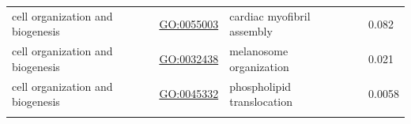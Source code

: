 \documentclass[
]{article}
\begin{document}
\begin{longtable}[]{@{}lllll@{}}
\begin{minipage}[t]{0.17\columnwidth}\raggedright
cell organization and biogenesis\strut
\end{minipage} & \begin{minipage}[t]{0.17\columnwidth}\raggedright
\url{GO:0055003}\strut
\end{minipage} & \begin{minipage}[t]{0.17\columnwidth}\raggedright
cardiac myofibril assembly\strut
\end{minipage} & \begin{minipage}[t]{0.17\columnwidth}\raggedright
\strut
\end{minipage} & \begin{minipage}[t]{0.17\columnwidth}\raggedright
0.082\strut
\end{minipage}\tabularnewline
\begin{minipage}[t]{0.17\columnwidth}\raggedright
cell organization and biogenesis\strut
\end{minipage} & \begin{minipage}[t]{0.17\columnwidth}\raggedright
\url{GO:0032438}\strut
\end{minipage} & \begin{minipage}[t]{0.17\columnwidth}\raggedright
melanosome organization\strut
\end{minipage} & \begin{minipage}[t]{0.17\columnwidth}\raggedright
\strut
\end{minipage} & \begin{minipage}[t]{0.17\columnwidth}\raggedright
0.021\strut
\end{minipage}\tabularnewline
\begin{minipage}[t]{0.17\columnwidth}\raggedright
cell organization and biogenesis\strut
\end{minipage} & \begin{minipage}[t]{0.17\columnwidth}\raggedright
\url{GO:0045332}\strut
\end{minipage} & \begin{minipage}[t]{0.17\columnwidth}\raggedright
phospholipid translocation\strut
\end{minipage} & \begin{minipage}[t]{0.17\columnwidth}\raggedright
\strut
\end{minipage} & \begin{minipage}[t]{0.17\columnwidth}\raggedright
0.0058\strut
\end{minipage}\tabularnewline
\begin{minipage}[t]{0.17\columnwidth}\raggedright

\end{minipage}
\end{longtable}
\end{document}

